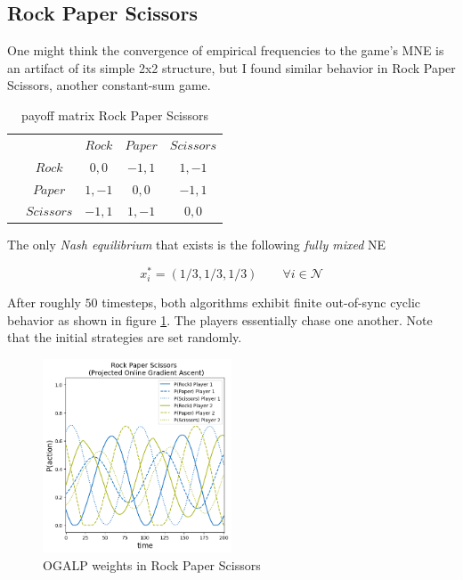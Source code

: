 \subsection{Rock Paper Scissors}\label{subsection:rockPaperScissors}

One might think the convergence of empirical frequencies to the game's MNE is an artifact of its simple 2x2 structure, but I found similar behavior in Rock Paper Scissors, another constant-sum game.

\begin{table}[H]\centering
\setlength{\extrarowheight}{2pt}
\begin{tabular}{cc|c|c|c|}
  & \multicolumn{1}{c}{} & \multicolumn{1}{c}{$Rock$}  & \multicolumn{1}{c}{$Paper$}  & \multicolumn{1}{c}{$Scissors$} \\\cline{3-5}
            & $Rock$ & $0,0$ & $-1,1$ & $1,-1$ \\ \cline{3-5}
            & $Paper$ & $1,-1$ & $0,0$ & $-1,1$ \\\cline{3-5}
            & $Scissors$ & $-1,1$ & $1,-1$ & $0,0$ \\\cline{3-5}
\end{tabular}\caption{\label{tab:payoffRPS}payoff matrix Rock Paper Scissors}
\end{table}

The only \textit{Nash equilibrium} that exists is the following \textit{fully mixed} NE

\begin{equation*}
    x_{i}^{*} = (1/3,1/3,1/3) \qquad \forall i \in \mathcal{N}
\end{equation*}

After roughly $50$ timesteps, both algorithms exhibit finite out-of-sync cyclic behavior as shown in figure \ref{fig:RPS2}. The players essentially chase one another. Note that the initial strategies are set randomly. 

\begin{figure}[H]
    \centering
    \includegraphics[width=0.5\textwidth]{logos/RPS2.png}
    \caption{OGALP weights in Rock Paper Scissors}
    \label{fig:RPS2}
\end{figure}



